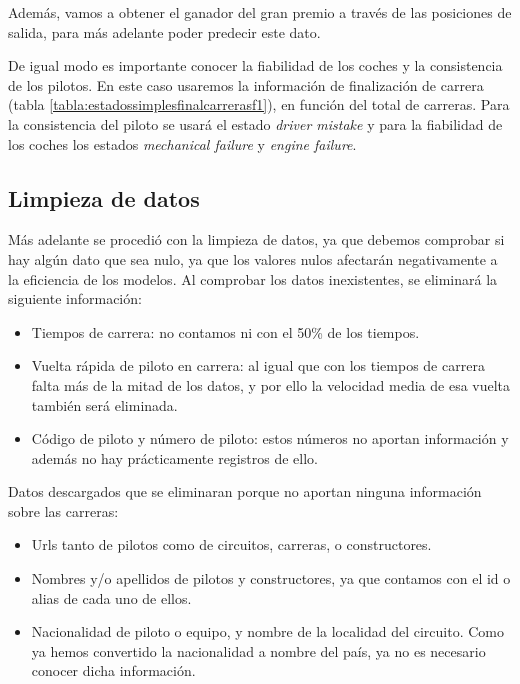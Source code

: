 Además, vamos a obtener el ganador del gran premio a través de las posiciones de salida, para más adelante poder predecir este dato.

De igual modo es importante conocer la fiabilidad de los coches y la consistencia de los pilotos. En este caso usaremos la información de finalización de carrera (tabla \ref{tabla:estadossimplesfinalcarrerasf1}), en función del total de carreras. Para la consistencia del piloto se usará el estado \textit{driver mistake} y para la fiabilidad de los coches los estados \textit{mechanical failure} y \textit{engine failure}.

\subsection{Limpieza de datos}

Más adelante se procedió con la limpieza de datos, ya que debemos comprobar si hay algún dato que sea nulo, ya que los valores nulos afectarán negativamente a la eficiencia de los modelos. 
Al comprobar los datos inexistentes, se eliminará la siguiente información: 

\begin{itemize}
	\item Tiempos de carrera: no contamos ni con el 50\% de los tiempos.
	\item Vuelta rápida de piloto en carrera: al igual que con los tiempos de carrera falta más de la mitad de los datos, y por ello la velocidad media de esa vuelta también será eliminada.
    \item Código de piloto y número de piloto: estos números no aportan información y además no hay prácticamente registros de ello.
\end{itemize} 

Datos descargados que se eliminaran porque no aportan ninguna información sobre las carreras: 
    \begin{itemize}
        \item Urls tanto de pilotos como de circuitos, carreras, o constructores.
        \item Nombres y/o apellidos de pilotos y constructores, ya que contamos con el id o alias de cada uno de ellos.
        \item Nacionalidad de piloto o equipo, y nombre de la localidad del circuito. Como ya hemos convertido la nacionalidad a nombre del país, ya no es necesario conocer dicha información.
    \end{itemize}


